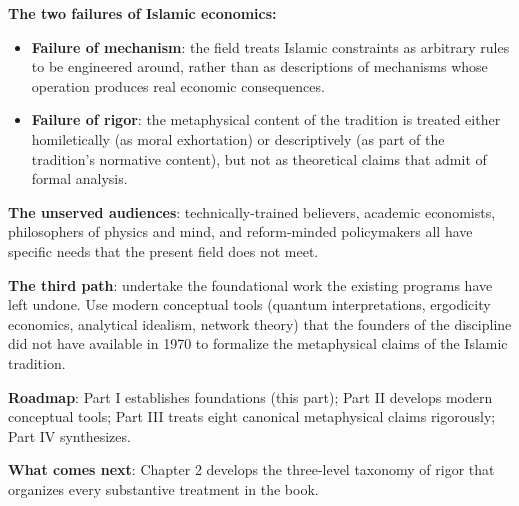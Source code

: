 \begin{summarybox}
\textbf{The two failures of Islamic economics:}
\begin{itemize}[leftmargin=1.5em]
    \item \textbf{Failure of mechanism}: the field treats Islamic
    constraints as arbitrary rules to be engineered around, rather
    than as descriptions of mechanisms whose operation produces real
    economic consequences.
    \item \textbf{Failure of rigor}: the metaphysical content of the
    tradition is treated either homiletically (as moral exhortation)
    or descriptively (as part of the tradition's normative content),
    but not as theoretical claims that admit of formal analysis.
\end{itemize}

\textbf{The unserved audiences}: technically-trained believers,
academic economists, philosophers of physics and mind, and reform-minded
policymakers all have specific needs that the present field does not
meet.

\textbf{The third path}: undertake the foundational work the existing
programs have left undone. Use modern conceptual tools (quantum
interpretations, ergodicity economics, analytical idealism, network
theory) that the founders of the discipline did not have available in
1970 to formalize the metaphysical claims of the Islamic tradition.

\textbf{Roadmap}: Part I establishes foundations (this part); Part II
develops modern conceptual tools; Part III treats eight canonical
metaphysical claims rigorously; Part IV synthesizes.

\textbf{What comes next}: Chapter 2 develops the three-level taxonomy
of rigor that organizes every substantive treatment in the book.
\end{summarybox}

\cleardoublepage
